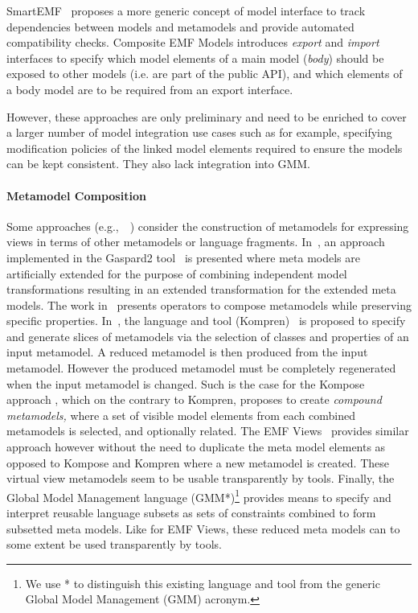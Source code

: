 SmartEMF~\cite{HesselundMODELS2008, smartemf-website} proposes a more generic concept of model interface to track dependencies between models and metamodels and provide automated compatibility checks. Composite EMF Models \cite{JurackICGT2010, compositeemfmodels-website} introduces \emph{export} and \emph{import} interfaces to specify which model elements of a main model (\emph{body}) should be exposed to other models (i.e. are part of the public API), and which elements of a body model are to be required from an export interface.

However, these approaches are only preliminary and need to be enriched to cover a larger number of model integration use cases such as for example, specifying modification policies of the linked model elements required to ensure the models can be kept consistent. They also lack integration into GMM.

\paragraph{Metamodel Composition} 
%
Some approaches (e.g.,~\cite{kompren-website, kompose-website, EtienSAC2010,emfviews-website}~\cite{BlouinGemoc2014}) consider the construction of metamodels for expressing views in terms of other metamodels or language fragments. In~\cite{EtienSAC2010}, an approach implemented in the Gaspard2 tool~\cite{gaspard2-website} is presented where meta models are artificially extended for the purpose of combining independent model transformations resulting in an extended transformation for the extended meta models. %
The work in~\cite{FASE2012} presents operators to compose metamodels while preserving specific properties. %
In~\cite{ABlouinSoSyM2015}, the language  and tool (Kompren)~\cite{kompren-website} is proposed to specify and generate slices of metamodels via the selection of classes and properties of an input metamodel. A reduced metamodel is then produced from the input metamodel. However the produced metamodel must be completely regenerated when the input metamodel is changed.
Such is the case for the Kompose approach \cite{kompose-website}, which on the contrary to Kompren, proposes to create \emph{compound metamodels,} where a set of visible model elements from each combined metamodels is selected, and optionally related. The EMF Views~\cite{emfviews-website, CaueIDM2011} provides similar approach however without the need to duplicate the meta model elements as opposed to Kompose and Kompren where a new metamodel is created. These virtual view metamodels seem to be usable transparently by tools.
Finally, the Global Model Management language (GMM*)\footnote{We use * to distinguish this existing language and tool from the generic Global Model Management (GMM) acronym.} \cite{BlouinGemoc2014} provides means to specify and interpret reusable language subsets as sets of constraints combined to form subsetted meta models. Like for EMF Views, these reduced meta models can to some extent be used transparently by tools.


